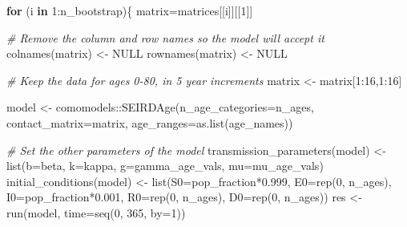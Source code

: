 \documentclass[
]{article}
\newenvironment{Shaded}{\begin{snugshade}}{\end{snugshade}}
\newcommand{\AttributeTok}[1]{\textcolor[rgb]{0.77,0.63,0.00}{#1}}
\newcommand{\CommentTok}[1]{\textcolor[rgb]{0.56,0.35,0.01}{\textit{#1}}}
\newcommand{\ConstantTok}[1]{\textcolor[rgb]{0.00,0.00,0.00}{#1}}
\newcommand{\ControlFlowTok}[1]{\textcolor[rgb]{0.13,0.29,0.53}{\textbf{#1}}}
\newcommand{\DecValTok}[1]{\textcolor[rgb]{0.00,0.00,0.81}{#1}}
\newcommand{\FloatTok}[1]{\textcolor[rgb]{0.00,0.00,0.81}{#1}}
\newcommand{\FunctionTok}[1]{\textcolor[rgb]{0.00,0.00,0.00}{#1}}
\newcommand{\NormalTok}[1]{#1}
\newcommand{\OtherTok}[1]{\textcolor[rgb]{0.56,0.35,0.01}{#1}}
\newcommand{\SpecialCharTok}[1]{\textcolor[rgb]{0.00,0.00,0.00}{#1}}
\begin{document}
\begin{Shaded}
\begin{Highlighting}[]
\ControlFlowTok{for}\NormalTok{ (i }\ControlFlowTok{in} \DecValTok{1}\SpecialCharTok{:}\NormalTok{n\_bootstrap)\{}
\NormalTok{  matrix}\OtherTok{=}\NormalTok{matrices[[i]][[}\DecValTok{1}\NormalTok{]]}

  \CommentTok{\# Remove the column and row names so the model will accept it}
  \FunctionTok{colnames}\NormalTok{(matrix) }\OtherTok{\textless{}{-}} \ConstantTok{NULL}
  \FunctionTok{rownames}\NormalTok{(matrix) }\OtherTok{\textless{}{-}} \ConstantTok{NULL}

  \CommentTok{\# Keep the data for ages 0{-}80, in 5 year increments}
\NormalTok{  matrix }\OtherTok{\textless{}{-}}\NormalTok{ matrix[}\DecValTok{1}\SpecialCharTok{:}\DecValTok{16}\NormalTok{,}\DecValTok{1}\SpecialCharTok{:}\DecValTok{16}\NormalTok{]}

\NormalTok{  model }\OtherTok{\textless{}{-}}\NormalTok{ comomodels}\SpecialCharTok{::}\FunctionTok{SEIRDAge}\NormalTok{(}\AttributeTok{n\_age\_categories=}\NormalTok{n\_ages,}
                   \AttributeTok{contact\_matrix=}\NormalTok{matrix,}
                   \AttributeTok{age\_ranges=}\FunctionTok{as.list}\NormalTok{(age\_names))}

  \CommentTok{\# Set the other parameters of the model}
  \FunctionTok{transmission\_parameters}\NormalTok{(model) }\OtherTok{\textless{}{-}} \FunctionTok{list}\NormalTok{(}\AttributeTok{b=}\NormalTok{beta, }\AttributeTok{k=}\NormalTok{kappa, }\AttributeTok{g=}\NormalTok{gamma\_age\_vals, }\AttributeTok{mu=}\NormalTok{mu\_age\_vals)}
  \FunctionTok{initial\_conditions}\NormalTok{(model) }\OtherTok{\textless{}{-}} \FunctionTok{list}\NormalTok{(}\AttributeTok{S0=}\NormalTok{pop\_fraction}\SpecialCharTok{*}\FloatTok{0.999}\NormalTok{,}
                                    \AttributeTok{E0=}\FunctionTok{rep}\NormalTok{(}\DecValTok{0}\NormalTok{, n\_ages),}
                                    \AttributeTok{I0=}\NormalTok{pop\_fraction}\SpecialCharTok{*}\FloatTok{0.001}\NormalTok{,}
                                    \AttributeTok{R0=}\FunctionTok{rep}\NormalTok{(}\DecValTok{0}\NormalTok{, n\_ages),}
                                    \AttributeTok{D0=}\FunctionTok{rep}\NormalTok{(}\DecValTok{0}\NormalTok{, n\_ages))}
\NormalTok{  res }\OtherTok{\textless{}{-}} \FunctionTok{run}\NormalTok{(model, }\AttributeTok{time=}\FunctionTok{seq}\NormalTok{(}\DecValTok{0}\NormalTok{, }\DecValTok{365}\NormalTok{, }\AttributeTok{by=}\DecValTok{1}\NormalTok{))}
  

\end{Highlighting}
\end{Shaded}
\end{document}
